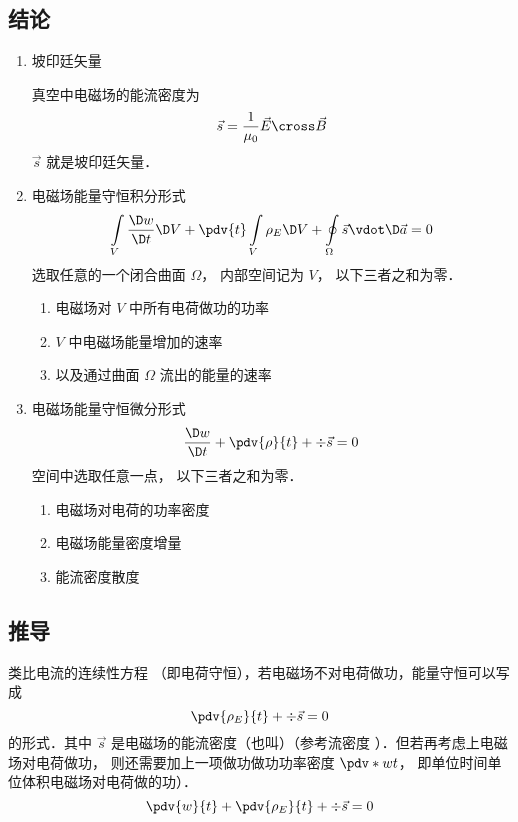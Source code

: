 



\subsection{结论}
\begin{enumerate}
\item 坡印廷矢量

真空中电磁场的能流密度为
\begin{equation}
\vec s = \frac{1}{{{\mu _0}}}\vec E \cross \vec B
\end{equation} 
 $\vec s$ 就是坡印廷矢量．


\item 电磁场能量守恒积分形式
\begin{equation}
\int\limits_V {\frac{{\D w}}{{\D t}}\D V}  + \pdv{t} \int\limits_V {{\rho _E}\D V}  + \oint\limits_\Omega  {\vec s \vdot \D \vec a}  = 0
\end{equation} 
选取任意的一个闭合曲面 $\Omega $， 内部空间记为 $V$， 以下三者之和为零．
\begin{enumerate}
\item 电磁场对 $V$ 中所有电荷做功的功率
\item $V$ 中电磁场能量增加的速率
\item 以及通过曲面 $\Omega $ 流出的能量的速率
\end{enumerate}

\item 电磁场能量守恒微分形式
\begin{equation}
\frac{{\D w}}{{\D t}} + \pdv{\rho}{t} + \div \vec s = 0
\end{equation} 
空间中选取任意一点， 以下三者之和为零．
\begin{enumerate}
\item 电磁场对电荷的功率密度
\item 电磁场能量密度增量
\item 能流密度散度
\end{enumerate}
\end{enumerate}

\subsection{推导}
类比电流的连续性方程%
（即电荷守恒），若电磁场不对电荷做功，能量守恒可以写成
\begin{equation}
\pdv{\rho_E}{t} + \div \vec s = 0
\end{equation} 
的形式．其中 $\vec s$ 是电磁场的能流密度（也叫）（参考流密度%
）．但若再考虑上电磁场对电荷做功， 则还需要加上一项做功做功功率密度 $\pdv*{w}{t}$， 即单位时间单位体积电磁场对电荷做的功）．
\begin{equation}\label{EBS_eq1}
\pdv{w}{t} + \pdv{\rho_E}{t} + \div \vec s = 0
\end{equation} 

